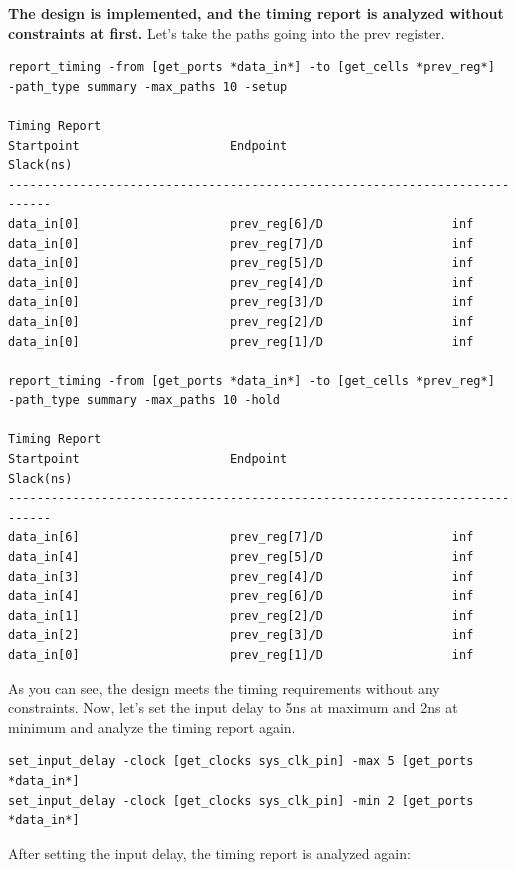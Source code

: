 \documentclass{report}
\begin{document}
\textbf{The design is implemented, and the timing report is analyzed without constraints at first.}
Let's take the paths going into the prev register.
\begin{verbatim}
report_timing -from [get_ports *data_in*] -to [get_cells *prev_reg*] 
-path_type summary -max_paths 10 -setup

Timing Report
Startpoint                     Endpoint                       Slack(ns)     
----------------------------------------------------------------------------
data_in[0]                     prev_reg[6]/D                  inf           
data_in[0]                     prev_reg[7]/D                  inf           
data_in[0]                     prev_reg[5]/D                  inf           
data_in[0]                     prev_reg[4]/D                  inf           
data_in[0]                     prev_reg[3]/D                  inf           
data_in[0]                     prev_reg[2]/D                  inf           
data_in[0]                     prev_reg[1]/D                  inf       

report_timing -from [get_ports *data_in*] -to [get_cells *prev_reg*] 
-path_type summary -max_paths 10 -hold

Timing Report
Startpoint                     Endpoint                       Slack(ns)     
----------------------------------------------------------------------------
data_in[6]                     prev_reg[7]/D                  inf           
data_in[4]                     prev_reg[5]/D                  inf           
data_in[3]                     prev_reg[4]/D                  inf           
data_in[4]                     prev_reg[6]/D                  inf           
data_in[1]                     prev_reg[2]/D                  inf           
data_in[2]                     prev_reg[3]/D                  inf           
data_in[0]                     prev_reg[1]/D                  inf
\end{verbatim}
As you can see, the design meets the timing requirements without any constraints. Now, let's set the input delay to 5ns at maximum and 2ns at minimum and analyze the timing report again.
\begin{verbatim}
set_input_delay -clock [get_clocks sys_clk_pin] -max 5 [get_ports *data_in*]
set_input_delay -clock [get_clocks sys_clk_pin] -min 2 [get_ports *data_in*]
\end{verbatim}
After setting the input delay, the timing report is analyzed again:
\end{document}
